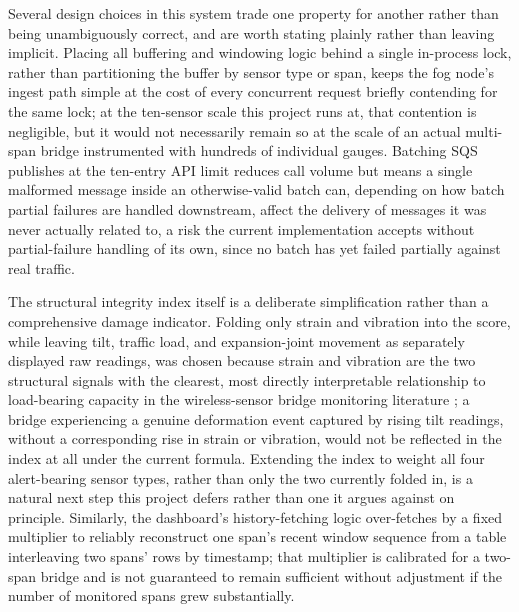 \documentclass[conference]{IEEEtran}
\begin{document}
Several design choices in this system trade one property for another rather than being unambiguously correct, and are worth stating plainly rather than leaving implicit. Placing all buffering and windowing logic behind a single in-process lock, rather than partitioning the buffer by sensor type or span, keeps the fog node's ingest path simple at the cost of every concurrent request briefly contending for the same lock; at the ten-sensor scale this project runs at, that contention is negligible, but it would not necessarily remain so at the scale of an actual multi-span bridge instrumented with hundreds of individual gauges. Batching SQS publishes at the ten-entry API limit reduces call volume but means a single malformed message inside an otherwise-valid batch can, depending on how batch partial failures are handled downstream, affect the delivery of messages it was never actually related to, a risk the current implementation accepts without partial-failure handling of its own, since no batch has yet failed partially against real traffic.

The structural integrity index itself is a deliberate simplification rather than a comprehensive damage indicator. Folding only strain and vibration into the score, while leaving tilt, traffic load, and expansion-joint movement as separately displayed raw readings, was chosen because strain and vibration are the two structural signals with the clearest, most directly interpretable relationship to load-bearing capacity in the wireless-sensor bridge monitoring literature \cite{ref6}; a bridge experiencing a genuine deformation event captured by rising tilt readings, without a corresponding rise in strain or vibration, would not be reflected in the index at all under the current formula. Extending the index to weight all four alert-bearing sensor types, rather than only the two currently folded in, is a natural next step this project defers rather than one it argues against on principle. Similarly, the dashboard's history-fetching logic over-fetches by a fixed multiplier to reliably reconstruct one span's recent window sequence from a table interleaving two spans' rows by timestamp; that multiplier is calibrated for a two-span bridge and is not guaranteed to remain sufficient without adjustment if the number of monitored spans grew substantially.
\end{document}
